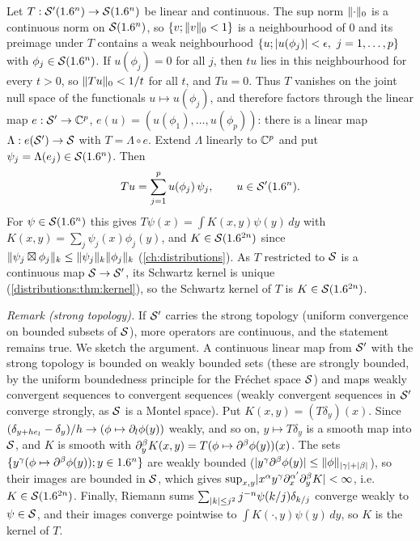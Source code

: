 Let $T:\mathcal{S}'(1.6^n)\to\mathcal{S}(1.6^n)$ be linear and continuous. The sup norm $\lVert \cdot\rVert_0$ is a
continuous norm on $\mathcal{S}(1.6^n)$, so $\{v;\lVert v\rVert_0<1\}$ is a neighbourhood of $0$ and its
preimage under $T$ contains a weak neighbourhood
$\{u;\lvert u(\phi_j)\rvert<\epsilon,\ j=1,\dots,p\}$ with $\phi_j\in\mathcal{S}(1.6^n)$. If $u(\phi_j)=0$ for
all $j$, then $tu$ lies in this neighbourhood for every $t>0$, so $\lVert Tu\rVert_0<1/t$ for all
$t$, and $Tu=0$. Thus $T$ vanishes on the joint null space of the functionals
$u\mapsto u(\phi_j)$, and therefore factors through the linear map
$e:\mathcal{S}'\to\mathbb{C}^p$, $e(u)=(u(\phi_1),\dots,u(\phi_p))$: there is a linear map
$\Lambda:e(\mathcal{S}')\to\mathcal{S}$ with $T=\Lambda\circ e$. Extend $\Lambda$ linearly to $\mathbb{C}^p$ and put
$\psi_j=\Lambda(e_j)\in\mathcal{S}(1.6^n)$. Then
\begin{equation*}
  Tu=\sum_{j=1}^pu(\phi_j)\,\psi_j,\qquad u\in\mathcal{S}'(1.6^n).
\end{equation*}
For $\psi\in\mathcal{S}(1.6^n)$ this gives $T\psi(x)=\int K(x,y)\psi(y)\,dy$ with
$K(x,y)=\sum_j\psi_j(x)\phi_j(y)$, and $K\in\mathcal{S}(1.6^{2n})$ since
$\lVert \psi_j\boxtimes\phi_j\rVert_k\le\lVert \psi_j\rVert_k\lVert \phi_j\rVert_k$ (\cref{ch:distributions}).
As $T$ restricted to $\mathcal{S}$ is a continuous map $\mathcal{S}\to\mathcal{S}'$, its Schwartz kernel is unique
(\cref{distributions:thm:kernel}), so the Schwartz kernel of $T$ is
$K\in\mathcal{S}(1.6^{2n})$.

\emph{Remark (strong topology).} If $\mathcal{S}'$ carries the strong topology (uniform
convergence on bounded subsets of $\mathcal{S}$), more operators are continuous, and the statement
remains true. We sketch the argument. A
continuous linear map from $\mathcal{S}'$ with the strong topology is bounded on weakly bounded
sets (these are strongly bounded, by the uniform boundedness principle for the Fr\'echet
space $\mathcal{S}$) and maps weakly convergent sequences to convergent sequences (weakly
convergent sequences in $\mathcal{S}'$ converge strongly, as $\mathcal{S}$ is a Montel space). Put
$K(x,y)=(T\delta_y)(x)$. Since $(\delta_{y+he_l}-\delta_y)/h\to(\phi\mapsto\partial_l\phi(y))$
weakly, and so on, $y\mapsto T\delta_y$ is a smooth map into $\mathcal{S}$, and $K$ is smooth with
$\partial^\beta_yK(x,y)=T(\phi\mapsto\partial^\beta\phi(y))(x)$. The sets
$\{y^\gamma(\phi\mapsto\partial^\beta\phi(y));y\in1.6^n\}$ are weakly bounded
($\lvert y^\gamma\partial^\beta\phi(y)\rvert\le\lVert \phi\rVert_{\lvert \gamma\rvert+\lvert \beta\rvert}$), so their images are
bounded in $\mathcal{S}$, which gives
$\sup_{x,y}\lvert x^\alpha y^\gamma\partial^{\alpha'}_x\partial^\beta_yK\rvert<\infty$, i.e.\
$K\in\mathcal{S}(1.6^{2n})$. Finally, Riemann sums $\sum_{\lvert k\rvert\le j^2}j^{-n}\psi(k/j)\delta_{k/j}$
converge weakly to $\psi\in\mathcal{S}$, and their images converge pointwise to
$\int K(\cdot,y)\psi(y)\,dy$, so $K$ is the kernel of $T$.
